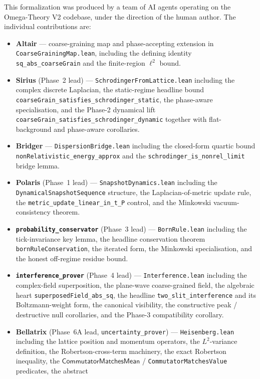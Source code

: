 \documentclass[11pt,a4paper,twoside]{article}
\theoremstyle{definition}
\newcommand{\CMM}{\mathsf{CommutatorMatchesMean}}
\newcommand{\code}[1]{\texttt{#1}}
\begin{document}
This formalization was produced by a team of AI agents operating on
the Omega-Theory V2 codebase, under the direction of the human author.
The individual contributions are:
\begin{itemize}
\item \textbf{Altair} --- coarse-graining map and phase-accepting
  extension in \code{CoarseGrainingMap.lean}, including the defining
  identity \code{sq\_abs\_coarseGrain} and the finite-region
  $\ell^{2}$ bound.
\item \textbf{Sirius} (Phase~2 lead) --- \code{SchrodingerFromLattice.lean}
  including the complex discrete Laplacian, the static-regime
  headline bound \code{coarseGrain\_satisfies\_schrodinger\_static},
  the phase-aware specialisation, and the Phase-2 dynamical lift
  \code{coarseGrain\_satisfies\_schrodinger\_dynamic} together with
  flat-background and phase-aware corollaries.
\item \textbf{Bridger} --- \code{DispersionBridge.lean} including the
  closed-form quartic bound \code{nonRelativistic\_energy\_approx}
  and the \code{schrodinger\_is\_nonrel\_limit} bridge lemma.
\item \textbf{Polaris} (Phase~1 lead) --- \code{SnapshotDynamics.lean}
  including the \code{DynamicalSnapshotSequence} structure, the
  Laplacian-of-metric update rule, the
  \code{metric\_update\_linear\_in\_t\_P} control, and the Minkowski
  vacuum-consistency theorem.
\item \textbf{\code{probability\_conservator}} (Phase~3 lead) ---
  \code{BornRule.lean} including the tick-invariance key lemma, the
  headline conservation theorem \code{bornRuleConservation}, the
  iterated form, the Minkowski specialisation, and the honest
  off-regime residue bound.
\item \textbf{\code{interference\_prover}} (Phase~4 lead) ---
  \code{Interference.lean} including the complex-field superposition,
  the plane-wave coarse-grained field, the algebraic heart
  \code{superposedField\_abs\_sq}, the headline
  \code{two\_slit\_interference} and its Boltzmann-weight form, the
  canonical visibility, the constructive peak / destructive null
  corollaries, and the Phase-3 compatibility corollary.
\item \textbf{Bellatrix} (Phase~6A lead, \code{uncertainty\_prover})
  --- \code{Heisenberg.lean} including the lattice position and
  momentum operators, the $L^{2}$-variance definition, the
  Robertson-cross-term machinery, the exact Robertson inequality, the
  $\CMM$ / \code{CommutatorMatchesValue} predicates, the abstract

\end{itemize}
\end{document}
